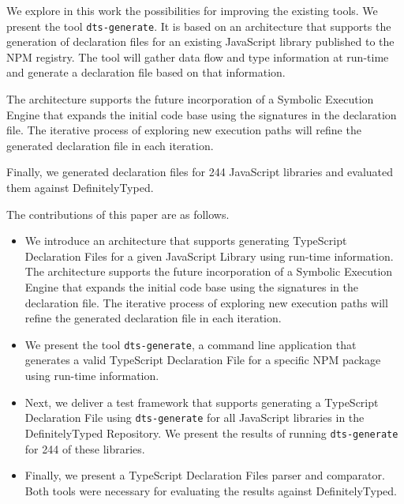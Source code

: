 \documentclass[a4paper,english,cleveref, autoref]{lipics-v2019}
\begin{document}
We explore in this work the possibilities for improving the existing tools. We present the tool \lstinline[language={}]{dts-generate}. It is based on an architecture that supports the generation of declaration files for an existing JavaScript library published to the NPM registry. The tool will gather data flow and type information at run-time and generate a declaration file based on that information.

The architecture supports the future incorporation of a Symbolic Execution Engine that expands the initial code base using the signatures in the declaration file. The iterative process of exploring new execution paths will refine the generated declaration file in each iteration.

Finally, we generated declaration files for 244 JavaScript libraries and evaluated them against DefinitelyTyped.

The contributions of this paper are as follows.
\begin{itemize}
    \item We introduce an architecture that supports generating TypeScript Declaration Files for a given JavaScript Library using run-time information. The architecture supports the future incorporation of a Symbolic Execution Engine that expands the initial code base using the signatures in the declaration file. The iterative process of exploring new execution paths will refine the generated declaration file in each iteration.

    \item We present the tool \lstinline{dts-generate}, a command line application that generates a valid TypeScript Declaration File for a specific NPM package using run-time information.

    \item Next, we deliver a test framework that supports generating a TypeScript Declaration File using \lstinline{dts-generate} for all JavaScript libraries in the DefinitelyTyped Repository. We present the results of running \lstinline{dts-generate} for 244 of these libraries.

    \item Finally, we present a TypeScript Declaration Files parser and comparator. Both tools were necessary for evaluating the results against DefinitelyTyped.
\end{itemize}
\end{document}
